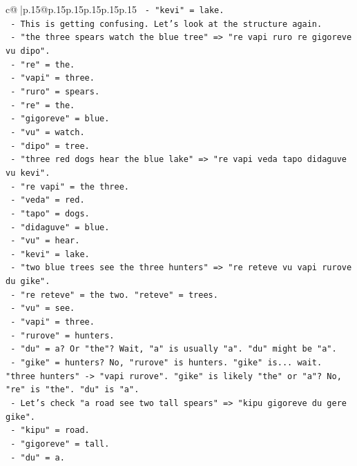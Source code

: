 \documentclass{article}
\begin{document}
{\begin{supertabular}{c@{$\;$}|p{.15\linewidth}@{}p{.15\linewidth}p{.15\linewidth}p{.15\linewidth}p{.15\linewidth}p{.15\linewidth}}
{{{\texttt{     {-} "kevi" = lake.} \\
\texttt{   {-} This is getting confusing. Let's look at the structure again.} \\
\texttt{   {-} "the three spears watch the blue tree" => "re vapi ruro re gigoreve vu dipo".} \\
\texttt{     {-} "re" = the.} \\
\texttt{     {-} "vapi" = three.} \\
\texttt{     {-} "ruro" = spears.} \\
\texttt{     {-} "re" = the.} \\
\texttt{     {-} "gigoreve" = blue.} \\
\texttt{     {-} "vu" = watch.} \\
\texttt{     {-} "dipo" = tree.} \\
\texttt{   {-} "three red dogs hear the blue lake" => "re vapi veda tapo didaguve vu kevi".} \\
\texttt{     {-} "re vapi" = the three.} \\
\texttt{     {-} "veda" = red.} \\
\texttt{     {-} "tapo" = dogs.} \\
\texttt{     {-} "didaguve" = blue.} \\
\texttt{     {-} "vu" = hear.} \\
\texttt{     {-} "kevi" = lake.} \\
\texttt{   {-} "two blue trees see the three hunters" => "re reteve vu vapi rurove du gike".} \\
\texttt{     {-} "re reteve" = the two. "reteve" = trees.} \\
\texttt{     {-} "vu" = see.} \\
\texttt{     {-} "vapi" = three.} \\
\texttt{     {-} "rurove" = hunters.} \\
\texttt{     {-} "du" = a? Or "the"? Wait, "a" is usually "a". "du" might be "a".} \\
\texttt{     {-} "gike" = hunters? No, "rurove" is hunters. "gike" is... wait. "three hunters" {-}> "vapi rurove". "gike" is likely "the" or "a"? No, "re" is "the". "du" is "a".} \\
\texttt{     {-} Let's check "a road see two tall spears" => "kipu gigoreve du gere gike".} \\
\texttt{       {-} "kipu" = road.} \\
\texttt{       {-} "gigoreve" = tall.} \\
\texttt{       {-} "du" = a.} \\
}}}
\end{supertabular}}
\end{document}
